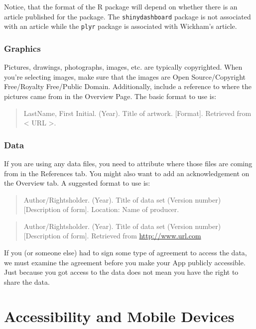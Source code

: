 \documentclass[
]{book}
\begin{document}
Notice, that the format of the R package will depend on whether there is an article published for the package. The \texttt{shinydashboard} package is not associated with an article while the \texttt{plyr} package is associated with Wickham's article.

\hypertarget{graphics-1}{%
\section{Graphics}\label{graphics-1}}

Pictures, drawings, photographs, images, etc. are typically copyrighted. When you're selecting images, make sure that the images are Open Source/Copyright Free/Royalty Free/Public Domain. Additionally, include a reference to where the pictures came from in the Overview Page. The basic format to use is:

\begin{quote}
LastName, First Initial. (Year). Title of artwork. {[}Format{]}. Retrieved from \textless{} URL \textgreater.
\end{quote}

\hypertarget{data}{%
\section{Data}\label{data}}

If you are using any data files, you need to attribute where those files are coming from in the References tab. You might also want to add an acknowledgement on the Overview tab. A suggested format to use is:

\begin{quote}
Author/Rightsholder. (Year). Title of data set (Version number) {[}Description of form{]}. Location: Name of producer.
\end{quote}

\begin{quote}
Author/Rightsholder. (Year). Title of data set (Version number) {[}Description of form{]}. Retrieved from \url{http://www.url.com}
\end{quote}

If you (or someone else) had to sign some type of agreement to access the data, we must examine the agreement before you make your App publicly accessible. Just because you got access to the data does not mean you have the right to share the data.

\hypertarget{part-accessibility-and-mobile-devices}{%
\part{Accessibility and Mobile Devices}\label{part-accessibility-and-mobile-devices}}
\end{document}
